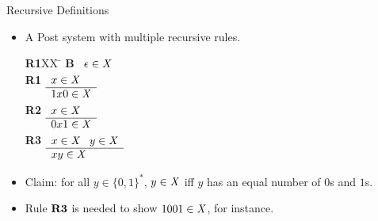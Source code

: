 \begin{wideslide}[bm=,toc=]{Recursive Definitions}
\begin{itemize}
\item  A Post system with multiple recursive rules.
\begin{tabbing}
{\bf R1}XX \=  \kill
{\bf B} \>
        \(\begin{array}[t]{l}
        \epsilon \in \mbox{\it X\/}
        \end{array}\) \\[2ex]

{\bf R1} \>
        \(\begin{array}[t]{l}
        x\in \mbox{\it X\/} \\
        \hline
        1x0 \in \mbox{\it X\/}
        \end{array}\) \\[2ex]

{\bf R2} \>
        \(\begin{array}[t]{l}
        x\in \mbox{\it X\/} \\
        \hline
        0x1 \in \mbox{\it X\/}
        \end{array}\) \\[2ex]
       
{\bf R3} \>
        \(\begin{array}[t]{l}
        x \in \mbox{\it X\/} \;\;\;y \in \mbox{\it X\/} \\
        \hline
        xy \in \mbox{\it X\/}
        \end{array}\)
\end{tabbing}
\item Claim: for all $y \in \{0,1\}^*$, $y \in \mbox{\it X\/}$ iff $y$ has an equal
number of $0$s and $1$s.
\item Rule $\mbox{\bf R3}$ is needed to show $1001 \in \mbox{\it X\/}$, for instance.
\end{itemize}
\end{wideslide}

